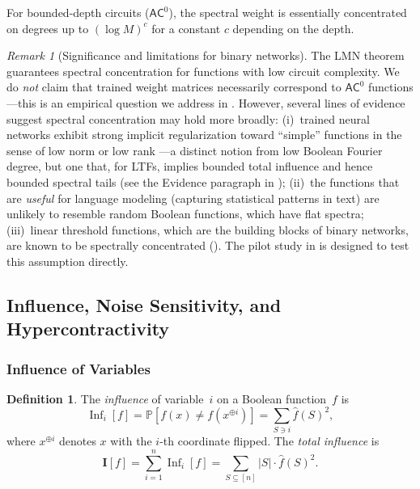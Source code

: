 \documentclass[12pt,a4paper]{article}
\theoremstyle{plain}
\theoremstyle{definition}
\newtheorem{definition}[theorem]{Definition}
\theoremstyle{remark}
\newtheorem{remark}[theorem]{Remark}
\newcommand{\Prob}{\mathbb{P}}
\newcommand{\fhat}{\widehat{f}}
\newcommand{\Inf}{\operatorname{Inf}}
\begin{document}
For bounded-depth circuits ($\mathsf{AC}^0$), the spectral weight is essentially concentrated on degrees up to $(\log M)^c$ for a constant $c$ depending on the depth.

\begin{remark}[Significance and limitations for binary networks]\label{rem:lmn-significance}
The LMN theorem guarantees spectral concentration for functions with low circuit complexity. We do \emph{not} claim that trained weight matrices necessarily correspond to $\mathsf{AC}^0$ functions---this is an empirical question we address in . However, several lines of evidence suggest spectral concentration may hold more broadly: (i)~trained neural networks exhibit strong implicit regularization toward ``simple'' functions in the sense of low norm or low rank \citep{neyshabur2015norm}---a distinct notion from low Boolean Fourier degree, but one that, for LTFs, implies bounded total influence and hence bounded spectral tails (see the Evidence paragraph in ); (ii)~the functions that are \emph{useful} for language modeling (capturing statistical patterns in text) are unlikely to resemble random Boolean functions, which have flat spectra; (iii)~linear threshold functions, which are the building blocks of binary networks, are known to be spectrally concentrated (). The pilot study in  is designed to test this assumption directly.
\end{remark}


\subsection{Influence, Noise Sensitivity, and Hypercontractivity}\label{sec:influence}

\subsubsection{Influence of Variables}

\begin{definition}\label{def:influence}
The \emph{influence} of variable~$i$ on a Boolean function~$f$ is
\begin{equation}\label{eq:influence}
    \Inf_i[f] = \Prob[f(x) \neq f(x^{\oplus i})] = \sum_{S \ni i} \fhat(S)^2,
\end{equation}
where $x^{\oplus i}$ denotes $x$ with the $i$-th coordinate flipped. The \emph{total influence} is
\begin{equation}\label{eq:total-influence}
    \mathbf{I}[f] = \sum_{i=1}^{n} \Inf_i[f] = \sum_{S \subseteq [n]} |S| \cdot \fhat(S)^2.
\end{equation}
\end{definition}
\end{document}
